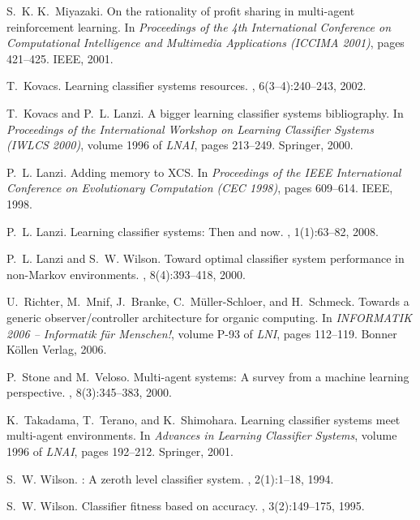 \documentclass{sig-alternate}
\begin{document}
\begin{thebibliography}{10}
S.~K. K.~Miyazaki.
\newblock On the rationality of profit sharing in multi-agent reinforcement
  learning.
\newblock In {\em Proceedings of the 4th International Conference on
  Computational Intelligence and Multimedia Applications (ICCIMA 2001)}, pages
  421--425. IEEE, 2001.

T.~Kovacs.
\newblock Learning classifier systems resources.
, 6(3--4):240--243, 2002.

T.~Kovacs and P.~L. Lanzi.
\newblock A bigger learning classifier systems bibliography.
\newblock In {\em Proceedings of the International Workshop on Learning
  Classifier Systems (IWLCS 2000)}, volume 1996 of {\em LNAI}, pages 213--249.
  Springer, 2000.

P.~L. Lanzi.
\newblock Adding memory to {XCS}.
\newblock In {\em Proceedings of the IEEE International Conference on
  Evolutionary Computation (CEC 1998)}, pages 609--614. IEEE, 1998.

P.~L. Lanzi.
\newblock Learning classifier systems: {T}hen and now.
, 1(1):63--82, 2008.

P.~L. Lanzi and S.~W. Wilson.
\newblock Toward optimal classifier system performance in non-{M}arkov
  environments.
, 8(4):393--418, 2000.

U.~Richter, M.~Mnif, J.~Branke, C.~M{\"{u}}ller-Schloer, and H.~Schmeck.
\newblock Towards a generic observer/controller architecture for organic
  computing.
\newblock In {\em INFORMATIK 2006 -- Informatik f{\"u}r Menschen!}, volume P-93
  of {\em LNI}, pages 112--119. Bonner K{\"o}llen Verlag, 2006.

P.~Stone and M.~Veloso.
\newblock Multi-agent systems: {A} survey from a machine learning perspective.
, 8(3):345--383, 2000.

K.~Takadama, T.~Terano, and K.~Shimohara.
\newblock Learning classifier systems meet multi-agent environments.
\newblock In {\em Advances in Learning Classifier Systems}, volume 1996 of {\em
  LNAI}, pages 192--212. Springer, 2001.

S.~W. Wilson.
: {A} zeroth level classifier system.
, 2(1):1--18, 1994.

S.~W. Wilson.
\newblock Classifier fitness based on accuracy.
, 3(2):149--175, 1995.

\end{thebibliography}
\end{document}
